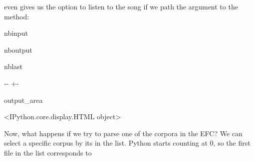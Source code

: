 \documentclass[letterpaper,10pt,english]{sphinxmanual}
\newlength\nbsphinxcodecellspacing
\begin{document}
\sphinxAtStartPar
{} even gives us the option to listen to the song if we path the  argument to the  method:

\begin{sphinxuseclass}{nbinput}
{
\begin{sphinxVerbatim}[commandchars=\\\{\}]
\llap{\color{nbsphinxin}[11]:\,\hspace{\fboxrule}\hspace{\fboxsep}}
\end{sphinxVerbatim}
}

\end{sphinxuseclass}
\begin{sphinxuseclass}{nboutput}
\begin{sphinxuseclass}{nblast}
{

\kern-\sphinxverbatimsmallskipamount\kern-\baselineskip
\kern+\FrameHeightAdjust\kern-\fboxrule
\vspace{\nbsphinxcodecellspacing}

\begin{sphinxuseclass}{output_area}
\begin{sphinxuseclass}{}


\begin{sphinxVerbatim}[commandchars=\\\{\}]
<IPython.core.display.HTML object>
\end{sphinxVerbatim}



\end{sphinxuseclass}
\end{sphinxuseclass}
}

\end{sphinxuseclass}
\end{sphinxuseclass}
\sphinxAtStartPar
Now, what happens if we try to parse one of the corpora in the EFC? We can select a specific corpus by its  in the list. Python starts counting at 0, so the first file in the list corresponds to
\end{document}
